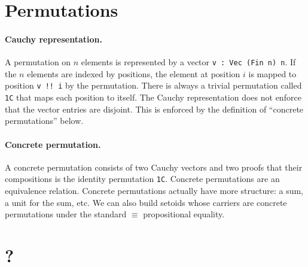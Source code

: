 \documentclass{article}
\begin{document}
\section{Permutations}

\paragraph*{Cauchy representation.} A permutation on $n$ elements is represented by a vector \texttt{v : Vec (Fin n) n}. If the $n$ elements are indexed by positions, the element at position $i$ is mapped to position \texttt{v !! i} by the permutation. There is always a trivial permutation called \texttt{1C} that maps each position to itself. The Cauchy representation does not enforce that the vector entries are disjoint. This is enforced by the definition of ``concrete permutations'' below. 

\paragraph*{Concrete permutation.} A concrete permutation consists of two Cauchy vectors and two proofs that their compositions is the identity permutation \texttt{1C}. Concrete permutations are an equivalence relation. Concrete permutations actually have more structure: a sum, a unit for the sum, etc. We can also build setoids whose carriers are concrete permutations under the standard $\equiv$ propositional equality.

\section{?}


\end{document}
